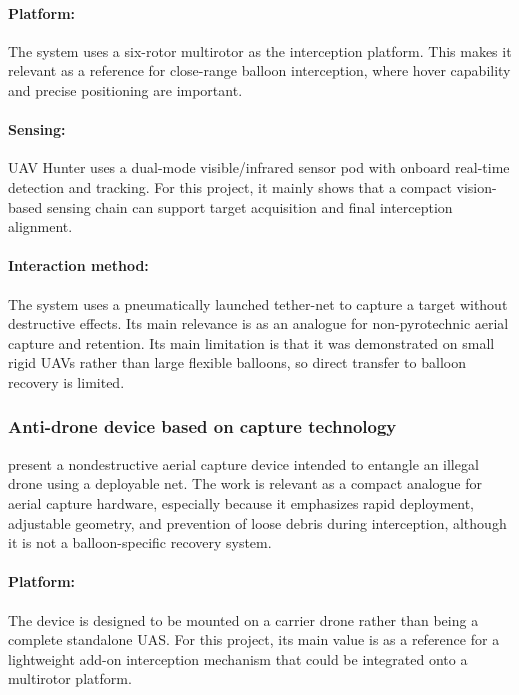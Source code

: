 \paragraph{Platform:} The system uses a six-rotor multirotor as the interception platform. This makes it relevant as a reference for close-range balloon interception, where hover capability and precise positioning are important.

\paragraph{Sensing:} UAV Hunter uses a dual-mode visible/infrared sensor pod with onboard real-time detection and tracking. For this project, it mainly shows that a compact vision-based sensing chain can support target acquisition and final interception alignment.

\paragraph{Interaction method:} The system uses a pneumatically launched tether-net to capture a target without destructive effects. Its main relevance is as an analogue for non-pyrotechnic aerial capture and retention. Its main limitation is that it was demonstrated on small rigid UAVs rather than large flexible balloons, so direct transfer to balloon recovery is limited.


\subsubsection{Anti-drone device based on capture technology}
\cite{Chen2022AnTechnology} present a nondestructive aerial capture device intended to entangle an illegal drone using a deployable net. The work is relevant as a compact analogue for aerial capture hardware, especially because it emphasizes rapid deployment, adjustable geometry, and prevention of loose debris during interception, although it is not a balloon-specific recovery system.

\paragraph{Platform:} The device is designed to be mounted on a carrier drone rather than being a complete standalone UAS. For this project, its main value is as a reference for a lightweight add-on interception mechanism that could be integrated onto a multirotor platform.

